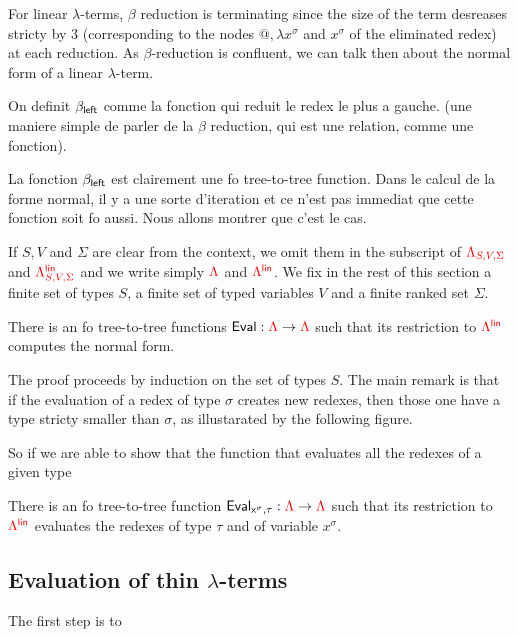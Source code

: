For linear $\lambda$-terms, $\beta$ reduction is terminating since the size of the term desreases stricty by 3 (corresponding to the nodes $\text{@}, \lambda x^\sigma$ and $x^\sigma$ of the eliminated redex) at each reduction. As $\beta$-reduction is confluent, we can talk then about the normal form of a linear $\lambda$-term.

On definit $\beta_{\sf{left}}$ comme la fonction qui reduit le redex le plus a gauche. (une maniere simple de parler de la $\beta$ reduction, qui est une relation, comme une fonction).

La fonction $\beta_{\sf{left}}$ est clairement une fo tree-to-tree function.  
Dans le calcul de la forme normal, il y a une sorte d'iteration et ce n'est pas immediat que cette fonction soit fo aussi. Nous allons montrer que c'est le cas. 


If $S, V$ and $\Sigma$ are clear from the context, we omit them in the subscript of ${\color{red}{\Lambda_{S,V,\Sigma}}}$ and ${\color{red}{\Lambda^{\sf{lin}}_{S,V,\Sigma}}}$ and we write simply ${\color{red}{\Lambda}}$ and ${\color{red}{\Lambda^{\sf{lin}}}}$. We fix in the rest of this section a finite set of types $S$, a finite set of typed variables $V$ and a finite  ranked set $\Sigma$.
 

\begin{theorem}
There is an fo tree-to-tree functions ${\sf{Eval}}:{\color{red}{\Lambda}} \to{\color{red}{\Lambda}}$ such that its restriction to ${\color{red}{\Lambda^{\sf{lin}}}}$ computes the normal form.
\end{theorem}

The proof proceeds by induction on the set of types $S$. The main remark is that if the evaluation of a redex of type $\sigma$ creates new redexes, then those one have a type stricty smaller than $\sigma$, as illustarated by the following figure.

So if we are able to show that the function that evaluates all the redexes of a given type 

\begin{theorem}
There is an fo tree-to-tree function ${\sf{Eval}_{x^\sigma,\tau}}:{\color{red}{\Lambda}} \to{\color{red}{\Lambda}}$ such that its restriction to ${\color{red}{\Lambda^{\sf{lin}}}}$ evaluates the redexes of type $\tau$ and of variable $x^\sigma$.
\end{theorem}

\subsection{Evaluation of thin $\lambda$-terms}

The first step is to 

